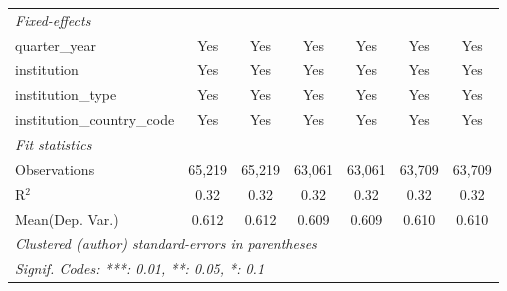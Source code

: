 \begin{tabular}{lcccccc}
   \midrule
   \emph{Fixed-effects}\\
   quarter\_year                      & Yes     & Yes         & Yes          & Yes            & Yes     & Yes\\  
   institution                        & Yes     & Yes         & Yes          & Yes            & Yes     & Yes\\  
   institution\_type                  & Yes     & Yes         & Yes          & Yes            & Yes     & Yes\\  
   institution\_country\_code         & Yes     & Yes         & Yes          & Yes            & Yes     & Yes\\  
   \midrule
   \emph{Fit statistics}\\
   Observations                       & 65,219  & 65,219      & 63,061       & 63,061         & 63,709  & 63,709\\  
   R$^2$                              & 0.32    & 0.32        & 0.32         & 0.32           & 0.32    & 0.32\\  
Mean(Dep. Var.) & 0.612 & 0.612 & 0.609 & 0.609 & 0.610 & 0.610 \\
   \midrule \midrule
   \multicolumn{7}{l}{\emph{Clustered (author) standard-errors in parentheses}}\\
   \multicolumn{7}{l}{\emph{Signif. Codes: ***: 0.01, **: 0.05, *: 0.1}}\\
\end{tabular}
\par\endgroup
